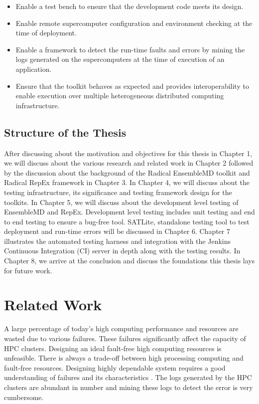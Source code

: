 \documentclass[10pt]{ruthesis}
\begin{document}
\begin{itemize}
    \item Enable a test bench to ensure that the development code meets its design.
	\item Enable remote supercomputer configuration and environment checking at the time of deployment.
	\item Enable a framework to detect the run-time faults and errors by mining the logs generated on the supercomputers at the time of execution of an application.
	\item Ensure that the toolkit behaves as expected and provides interoperability to enable execution over multiple heterogeneous distributed computing infrastructure.
\end{itemize}
   
\section{Structure of the Thesis}
After discussing about the motivation and objectives for this thesis in Chapter 1, we will discuss about the various research and related work in Chapter 2 followed by the discussion about the background of the Radical EnsembleMD toolkit and Radical RepEx framework in Chapter 3. In Chapter 4, we will discuss about the testing infrastructure, its significance and testing framework design for the toolkits. In Chapter 5, we will discuss about the development level testing of EnsembleMD and RepEx. Development level testing includes unit testing and end to end testing to ensure a bug-free tool. SATLite, standalone testing tool to test deployment and run-time errors will be discussed in Chapter 6. Chapter 7 illustrates the automated testing harness and integration with the Jenkins Continuous Integration (CI) server in depth along with the testing results. In Chapter 8, we arrive at the conclusion and discuss the foundations this thesis lays for future work. 

\chapter{Related Work}
A large percentage of today's high computing performance and resources are wasted due to various failures. These failures significantly affect the capacity of HPC clusters. Designing an ideal fault-free high computing resources is unfeasible. There is always a trade-off between high processing computing and fault-free resources. Designing highly dependable system requires a good understanding of failures and its characteristics \cite{ref8}. The logs generated by the HPC clusters are abundant in number and mining these logs to detect the error is very cumbersome.
\end{document}
